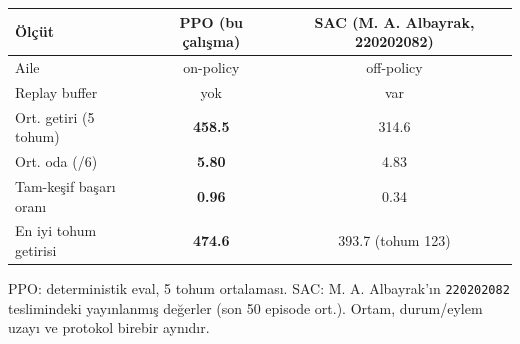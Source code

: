 \begin{tabular}{@{}lcc@{}}
\toprule
Ölçüt & PPO (bu çalışma) & SAC (M. A. Albayrak, 220202082) \\
\midrule
Aile & on-policy & off-policy \\
Replay buffer & yok & var \\
\midrule
Ort. getiri (5 tohum) & \textbf{458.5} & 314.6 \\
Ort. oda (/6) & \textbf{5.80} & 4.83 \\
Tam-keşif başarı oranı & \textbf{0.96} & 0.34 \\
En iyi tohum getirisi & \textbf{474.6} & 393.7 (tohum 123) \\
\bottomrule
\end{tabular}

\vspace{0.3em}
{\footnotesize PPO: deterministik eval, 5 tohum ortalaması. SAC: M. A. Albayrak'ın
\texttt{220202082} teslimindeki yayınlanmış değerler (son 50 episode ort.). Ortam,
durum/eylem uzayı ve protokol birebir aynıdır.}
